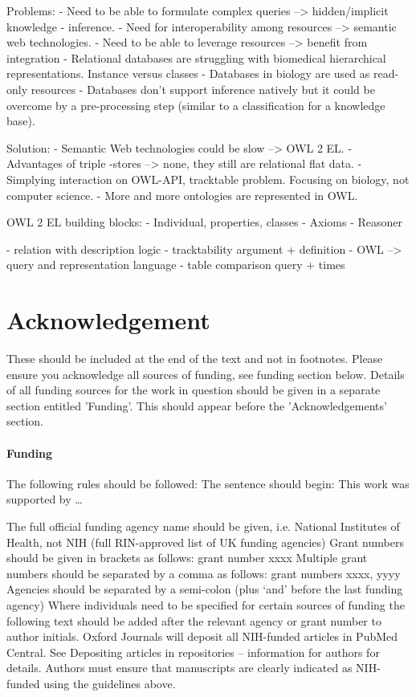 \documentclass{bioinfo}
\begin{document}
Problems:
- Need to be able to formulate complex queries --> hidden/implicit knowledge - inference.
- Need for interoperability among resources --> semantic web technologies.
- Need to be able to leverage resources --> benefit from integration
- Relational databases are struggling with biomedical hierarchical representations. Instance versus classes
- Databases in biology are used as read-only resources
- Databases don't support inference natively but it could be overcome by a
 pre-processing step (similar to a classification for a knowledge base).

Solution:
- Semantic Web technologies could be slow --> OWL 2 EL.
- Advantages of triple -stores --> none, they still are relational flat data.
- Simplying interaction on OWL-API, tracktable problem. Focusing on biology, not computer science.
- More and more ontologies are represented in OWL.

OWL 2 EL building blocks:
- Individual, properties, classes
- Axioms
- Reasoner

- relation with description logic
- tracktability argument + definition
- OWL --> query and representation language
- table comparison query + times



\section*{Acknowledgement}
These should be included at the end of the text and not in footnotes. Please ensure you acknowledge all 
sources of funding, see funding section below.
Details of all funding sources for the work in question should be given 
in a separate section entitled 'Funding'. This should appear before the 'Acknowledgements' section.

\paragraph{Funding\textcolon}
The following rules should be followed:
The sentence should begin: This work was supported by …
 
The full official funding agency name should be given, i.e. National Institutes of Health, not NIH 
(full RIN-approved list of UK funding agencies) Grant numbers should be given in brackets as follows: grant number xxxx 
Multiple grant numbers should be separated by a comma as follows: grant numbers xxxx, yyyy 
Agencies should be separated by a semi-colon (plus ‘and’ before the last funding agency) 
Where individuals need to be specified for certain sources of funding the following text should be added after the
relevant agency or grant number to author initials.
Oxford Journals will deposit all NIH-funded articles in PubMed Central. See Depositing articles in repositories – 
information for authors for details. Authors must ensure that manuscripts are clearly indicated as NIH-funded using the guidelines above.










\end{document}
